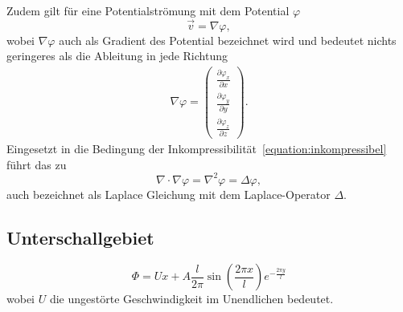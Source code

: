 Zudem gilt für eine Potentialströmung mit dem Potential $\varphi$
\begin{equation}
    \vec{v} = \nabla\varphi,
\end{equation}
wobei $\nabla\varphi$ auch als Gradient des Potential bezeichnet wird
und bedeutet nichts geringeres als die Ableitung in jede Richtung
\begin{align}
    \nabla\varphi
    =
    \begin{pmatrix}
        \frac{\partial \varphi_x}{\partial x}\\
        \frac{\partial \varphi_y}{\partial y}\\
        \frac{\partial \varphi_z}{\partial z}
    \end{pmatrix}.
\end{align} 
Eingesetzt in die Bedingung der Inkompressibilität~\ref{equation:inkompressibel}
führt das zu
\begin{equation}
    \nabla \cdot \nabla \varphi
    = 
    \nabla^2 \varphi
    =
    \Delta\varphi,
\end{equation}
auch bezeichnet als Laplace Gleichung mit dem Laplace-Operator $\Delta$.



\subsection{Unterschallgebiet\label{ueberschall:subsection:unterschallgebiet}}
\begin{equation}
    \Phi
    =
    Ux + A \frac{l}{2\pi}
    \sin(\frac{2\pi x}{l})
    e^{-\frac{2\pi y}{l}}
\end{equation}
wobei $U$ die ungestörte Geschwindigkeit im Unendlichen bedeutet.